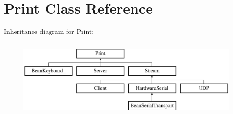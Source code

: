 \hypertarget{class_print}{}\section{Print Class Reference}
\label{class_print}
Inheritance diagram for Print\+:\begin{figure}[H]
\begin{center}
\leavevmode
\includegraphics[height=4.000000cm]{class_print}
\end{center}
\end{figure}

